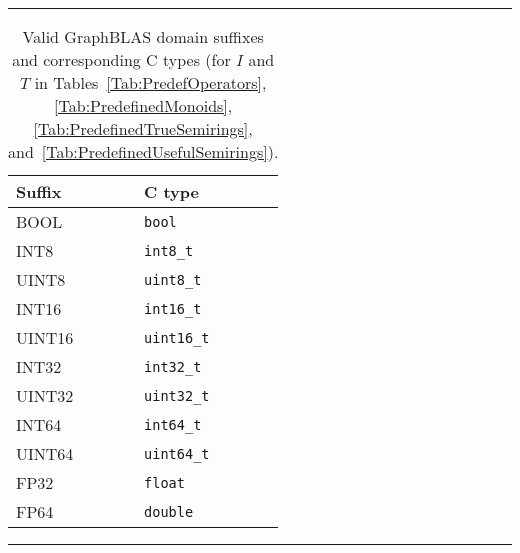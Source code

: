 \begin{table}
\hrule
\begin{center}
\caption{Valid GraphBLAS domain suffixes and corresponding C types (for $I$ and 
$T$ in Tables~\ref{Tab:PredefOperators}, \ref{Tab:PredefinedMonoids}, 
    \ref{Tab:PredefinedTrueSemirings}, 
and~\ref{Tab:PredefinedUsefulSemirings}).}
\label{Tab:PredefinedDomains}

\vspace{1\baselineskip}

\begin{tabular}{l|l}
Suffix            & C type \\ \hline
{\sf BOOL}        & {\tt bool} \\
{\sf INT8}        & {\tt int8\_t} \\
{\sf UINT8}       & {\tt uint8\_t} \\
{\sf INT16}       & {\tt int16\_t} \\
{\sf UINT16}      & {\tt uint16\_t} \\
{\sf INT32}       & {\tt int32\_t} \\
{\sf UINT32}      & {\tt uint32\_t} \\
{\sf INT64}       & {\tt int64\_t} \\
{\sf UINT64}      & {\tt uint64\_t} \\
{\sf FP32}        & {\tt float} \\
{\sf FP64}        & {\tt double} \\
\end{tabular}
\end{center}
\hrule
\end{table}

